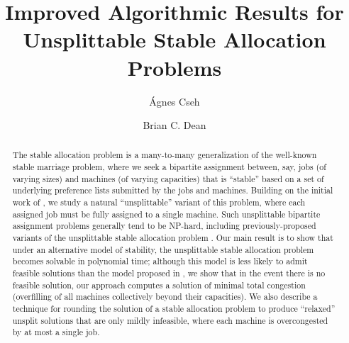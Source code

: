 \documentclass{llncs}
\begin{document}
\title{Improved Algorithmic Results for Unsplittable Stable Allocation 
Problems}
\author{\'{A}gnes Cseh \and Brian C. Dean}



\maketitle

\begin{abstract}
The stable allocation problem is a many-to-many generalization of the
well-known stable marriage problem, where we seek a bipartite
assignment between, say, jobs (of varying sizes) and machines (of
varying capacities) that is ``stable'' based on a set of underlying
preference lists submitted by the jobs and machines.  Building on the
initial work of \cite{dean_unsplit}, we study a natural
``unsplittable'' variant of this problem, where each assigned job must
be fully assigned to a single machine.  Such unsplittable bipartite
assignment problems generally tend to be NP-hard, including
previously-proposed variants of the unsplittable stable allocation
problem \cite{DBLP:journals/jco/McDermidM10}.  Our main result is to
show that under an alternative model of stability, the unsplittable
stable allocation problem becomes solvable in polynomial time;
although this model is less likely to admit feasible solutions than
the model proposed in \cite{DBLP:journals/jco/McDermidM10}, we show
that in the event there is no feasible solution, our approach computes
a solution of minimal total congestion (overfilling of all machines
collectively beyond their capacities).  We also describe a technique
for rounding the solution of a stable allocation problem to produce
``relaxed'' unsplit solutions that are only mildly infeasible, where
each machine is overcongested by at most a single job.  
\iffalse
\noindent \textbf{Keywords.} stable matchings, stable allocations,
rotations, unsplittable assignments
\fi
\end{abstract}
\end{document}
